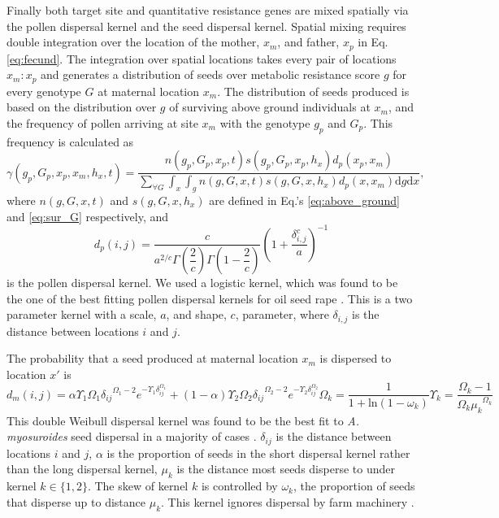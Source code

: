 \documentclass[10pt,letterpaper]{article}
\begin{document}
Finally both target site and quantitative resistance genes are mixed spatially via the pollen dispersal kernel and the seed dispersal kernel. Spatial mixing requires double integration over the location of the mother, $x_m$, and father, $x_p$ in Eq. \ref{eq:fecund}. The integration over spatial locations takes every pair of locations $x_m:x_p$ and generates a distribution of seeds over metabolic resistance score $g$ for every genotype $G$ at maternal location $x_m$. The distribution of seeds produced is based on the distribution over $g$ of surviving above ground individuals at $x_m$, and the frequency of pollen arriving at site $x_m$ with the genotype $g_p$ and $G_p$. This frequency is calculated as
\begin{equation}\label{eq:pollen_func}
\gamma(g_p, G_p, x_p, x_m, h_x, t) = \frac{n(g_p, G_p, x_p, t)
s(g_p, G_p, x_p, h_x) d_p(x_p, x_m)} {\sum_{\forall G}\int_{x}\int_{g} n(g, G, x, t) s(g, G, x, h_x) d_p(x, x_m) \text{d}g\text{d}x}, 
\end{equation}
where $n(g, G, x, t)$ and $s(g, G, x, h_x)$ are defined in Eq.'s \ref{eq:above_ground} and \ref{eq:sur_G} respectively, and 
\begin{equation}\label{eq:pollen_disp}
	d_p(i, j) = \frac{c}{a^{2/c}\Gamma\left(\dfrac{2}{c} \right)\Gamma\left(1 - \dfrac{2}{c} \right)}{\left( 1 + \dfrac{\delta_{i,j}^c}{a} \right)}^{-1} 
\end{equation} 
is the pollen dispersal kernel. We used a logistic kernel, which was found to be the one of the best fitting pollen dispersal kernels for oil seed rape \cite{Klei2006}. This is a two parameter kernel with a scale, $a$, and shape, $c$, parameter, where $\delta_{i,j}$ is the distance between locations $i$ and $j$. 

The probability that a seed produced at maternal location $x_m$ is dispersed to location $x'$ is 
\begin{subequations}\label{eq:seed_disp}
\begin{equation}\label{eq:seed_kern}
	d_m(i, j) = {\alpha \Upsilon_1 \Omega_1 \delta_{ij}}^{\Omega_1 - 2} e^{-\Upsilon_1 \delta_{ij}^{\Omega_1}} + {(1 - \alpha) \Upsilon_2 \Omega_2 \delta_{ij}}^{\Omega_2 - 2} e^{-\Upsilon_2 \delta_{ij}^{\Omega_2}}  
\end{equation}
\begin{equation}\label{eq:shape}
	\Omega_k = \frac{1}{1 + \text{ln}(1 - \omega_k)}
\end{equation}
\begin{equation}\label{eq:scale}
	\Upsilon_k = \frac{\Omega_k - 1}{{\Omega_k \mu_k}^{\Omega_k}}
\end{equation}
\end{subequations} 
This double Weibull dispersal kernel was found to be the best fit to \textit{A. myosuroides} seed dispersal in a majority of cases \cite{Colb2001}. $\delta_{ij}$ is the distance between locations $i$ and $j$, $\alpha$ is the proportion of seeds in the short dispersal kernel rather than the long dispersal kernel, $\mu_k$ is the distance most seeds disperse to under kernel $k \in \{1, 2\}$. The skew of kernel $k$ is controlled by $\omega_k$, the proportion of seeds that disperse up to distance $\mu_k$. This kernel ignores dispersal by farm machinery \cite{Colb2001}.    
\end{document}
